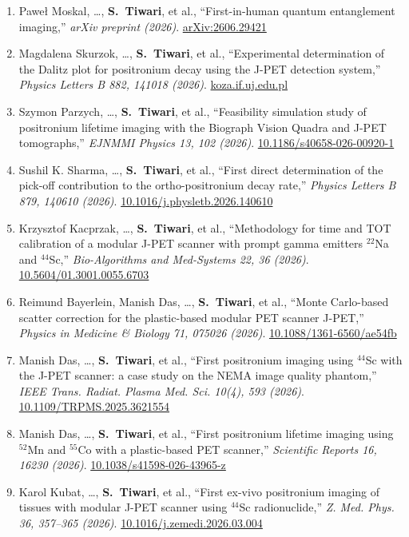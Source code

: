 \documentclass[10.5pt,a4paper]{article}
\newcommand{\me}{\textbf{S.~Tiwari}}
\newcommand{\doi}[2]{{\small\href{#1}{#2}}}
\begin{document}
\begin{enumerate}[resume]
\item Pawe{\l} Moskal, \ldots, \me, et al., ``First-in-human quantum entanglement imaging,'' \emph{arXiv preprint (2026)}. \doi{https://arxiv.org/abs/2606.29421}{arXiv:2606.29421}
\item Magdalena Skurzok, \ldots, \me, et al., ``Experimental determination of the Dalitz plot for positronium decay using the J-PET detection system,'' \emph{Physics Letters B 882, 141018 (2026)}. \doi{https://koza.if.uj.edu.pl/staff/stiwari}{koza.if.uj.edu.pl}
\item Szymon Parzych, \ldots, \me, et al., ``Feasibility simulation study of positronium lifetime imaging with the Biograph Vision Quadra and J-PET tomographs,'' \emph{EJNMMI Physics 13, 102 (2026)}. \doi{https://doi.org/10.1186/s40658-026-00920-1}{10.1186/s40658-026-00920-1}
\item Sushil K. Sharma, \ldots, \me, et al., ``First direct determination of the pick-off contribution to the ortho-positronium decay rate,'' \emph{Physics Letters B 879, 140610 (2026)}. \doi{https://doi.org/10.1016/j.physletb.2026.140610}{10.1016/j.physletb.2026.140610}
\item Krzysztof Kacprzak, \ldots, \me, et al., ``Methodology for time and TOT calibration of a modular J-PET scanner with prompt gamma emitters $^{22}$Na and $^{44}$Sc,'' \emph{Bio-Algorithms and Med-Systems 22, 36 (2026)}. \doi{https://doi.org/10.5604/01.3001.0055.6703}{10.5604/01.3001.0055.6703}
\item Reimund Bayerlein, Manish Das, \ldots, \me, et al., ``Monte Carlo-based scatter correction for the plastic-based modular PET scanner J-PET,'' \emph{Physics in Medicine \& Biology 71, 075026 (2026)}. \doi{https://doi.org/10.1088/1361-6560/ae54fb}{10.1088/1361-6560/ae54fb}
\item Manish Das, \ldots, \me, et al., ``First positronium imaging using $^{44}$Sc with the J-PET scanner: a case study on the NEMA image quality phantom,'' \emph{IEEE Trans. Radiat. Plasma Med. Sci. 10(4), 593 (2026)}. \doi{https://doi.org/10.1109/TRPMS.2025.3621554}{10.1109/TRPMS.2025.3621554}
\item Manish Das, \ldots, \me, et al., ``First positronium lifetime imaging using $^{52}$Mn and $^{55}$Co with a plastic-based PET scanner,'' \emph{Scientific Reports 16, 16230 (2026)}. \doi{https://doi.org/10.1038/s41598-026-43965-z}{10.1038/s41598-026-43965-z}
\item Karol Kubat, \ldots, \me, et al., ``First ex-vivo positronium imaging of tissues with modular J-PET scanner using $^{44}$Sc radionuclide,'' \emph{Z. Med. Phys. 36, 357--365 (2026)}. \doi{https://doi.org/10.1016/j.zemedi.2026.03.004}{10.1016/j.zemedi.2026.03.004}

\end{enumerate}
\end{document}
